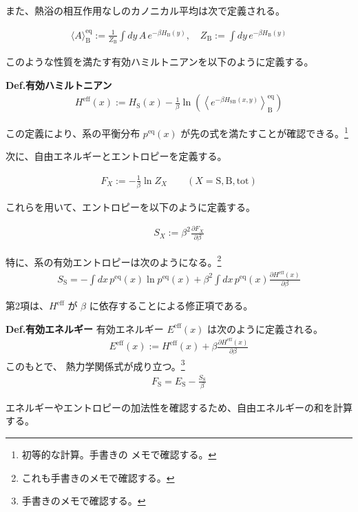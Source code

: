 \documentclass[a4paper,11pt]{jsarticle}
\numberwithin{equation}{section}
\begin{document}
また、熱浴の相互作用なしのカノニカル平均は次で定義される。

\begin{align}
\langle A \rangle_{\text{B}}^{\mathrm{eq}} := \frac{1}{Z_{\text{B}}} \int dy\, A\, e^{-\beta H_{\text{B}}(y)}, \quad
Z_{\text{B}} := \int dy\, e^{-\beta H_{\text{B}}(y)}
\end{align}

このような性質を満たす有効ハミルトニアンを以下のように定義する。
\begin{itembox}[l]{\textbf{Def.有効ハミルトニアン}}
\begin{align}
H^{\mathrm{eff}}(x) := H_{\text{S}}(x) - \frac{1}{\beta} \ln \left( \left\langle e^{-\beta H_{\text{SB}}(x,y)} \right\rangle_{\text{B}}^{\mathrm{eq}} \right)
\end{align}
\end{itembox}
この定義により、系の平衡分布 $p^{\mathrm{eq}}(x)$ が先の式を満たすことが確認できる。\footnote{初等的な計算。手書きの
メモで確認する。}

次に、自由エネルギーとエントロピーを定義する。

\begin{align}
F_X := - \frac{1}{\beta} \ln Z_X \qquad (X = \text{S}, \text{B}, \text{tot})
\end{align}

これらを用いて、エントロピーを以下のように定義する。

\begin{align}
S_X := \beta^2 \frac{\partial F_X}{\partial \beta}
\end{align}

特に、系の有効エントロピーは次のようになる。\footnote{これも手書きのメモで確認する。}
\begin{align}
S_{\text{S}} = - \int dx\, p^{\mathrm{eq}}(x) \ln p^{\mathrm{eq}}(x)
+ \beta^2 \int dx\, p^{\mathrm{eq}}(x) \frac{\partial H^{\mathrm{eff}}(x)}{\partial \beta}
\end{align}

第2項は、$H^{\mathrm{eff}}$ が $\beta$ に依存することによる修正項である。

\begin{itembox}[l]{\textbf{Def.有効エネルギー}}
有効エネルギー $E^{\mathrm{eff}}(x)$ は次のように定義される。
\begin{align}
E^{\mathrm{eff}}(x) := H^{\mathrm{eff}}(x) + \beta \frac{\partial H^{\mathrm{eff}}(x)}{\partial \beta}
\end{align}
このもとで、
熱力学関係式が成り立つ。\footnote{手書きのメモで確認する。}
\begin{align}
F_{\text{S}} = E_{\text{S}} - \frac{S_{\text{S}}}{\beta}
\end{align}
\end{itembox}
エネルギーやエントロピーの加法性を確認するため、自由エネルギーの和を計算する。
\end{document}
